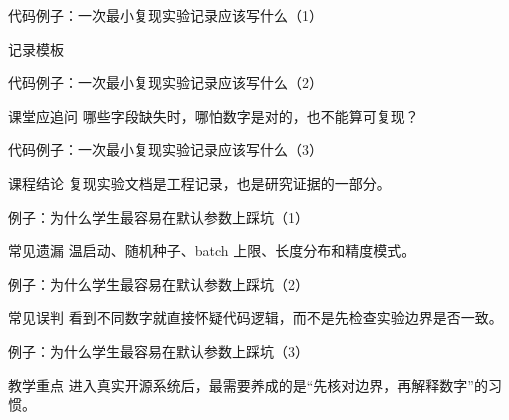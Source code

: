 \begin{frame}{代码例子：一次最小复现实验记录应该写什么（1）}
\begin{block}{记录模板}
    {\ttfamily\small
    \par
    \par
    \par
    }
  \end{block}
\end{frame}

\begin{frame}{代码例子：一次最小复现实验记录应该写什么（2）}
\begin{block}{课堂应追问}
    哪些字段缺失时，哪怕数字是对的，也不能算可复现？
  \end{block}
\end{frame}

\begin{frame}{代码例子：一次最小复现实验记录应该写什么（3）}
\begin{block}{课程结论}
    复现实验文档是工程记录，也是研究证据的一部分。
  \end{block}
\end{frame}

\begin{frame}{例子：为什么学生最容易在默认参数上踩坑（1）}
\begin{block}{常见遗漏}
    温启动、随机种子、batch 上限、长度分布和精度模式。
  \end{block}
\end{frame}

\begin{frame}{例子：为什么学生最容易在默认参数上踩坑（2）}
\begin{block}{常见误判}
    看到不同数字就直接怀疑代码逻辑，而不是先检查实验边界是否一致。
  \end{block}
\end{frame}

\begin{frame}{例子：为什么学生最容易在默认参数上踩坑（3）}
\begin{block}{教学重点}
    进入真实开源系统后，最需要养成的是“先核对边界，再解释数字”的习惯。
  \end{block}
\end{frame}

